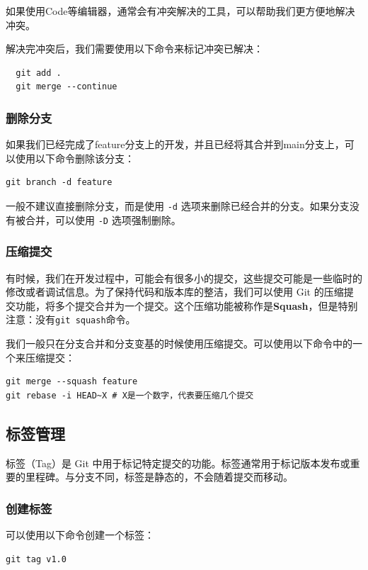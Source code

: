 \documentclass[../main.tex]{subfiles}
\begin{document}
如果使用Code等编辑器，通常会有冲突解决的工具，可以帮助我们更方便地解决冲突。

解决完冲突后，我们需要使用以下命令来标记冲突已解决：
\begin{verbatim}
  git add .
  git merge --continue
\end{verbatim}

\subsubsection{删除分支}

如果我们已经完成了feature分支上的开发，并且已经将其合并到main分支上，可以使用以下命令删除该分支：
\begin{verbatim}
git branch -d feature
\end{verbatim}

一般不建议直接删除分支，而是使用 \texttt{-d} 选项来删除已经合并的分支。如果分支没有被合并，可以使用 \texttt{-D} 选项强制删除。

\subsubsection{压缩提交}

有时候，我们在开发过程中，可能会有很多小的提交，这些提交可能是一些临时的修改或者调试信息。为了保持代码和版本库的整洁，我们可以使用 Git 的压缩提交功能，将多个提交合并为一个提交。这个压缩功能被称作是\textbf{Squash}，但是特别注意：没有\texttt{git squash}命令。

我们一般只在分支合并和分支变基的时候使用压缩提交。可以使用以下命令中的一个来压缩提交：
\begin{verbatim}
git merge --squash feature
git rebase -i HEAD~X # X是一个数字，代表要压缩几个提交
\end{verbatim}

\subsection{标签管理}
标签（Tag）是 Git 中用于标记特定提交的功能。标签通常用于标记版本发布或重要的里程碑。与分支不同，标签是静态的，不会随着提交而移动。

\subsubsection{创建标签}
可以使用以下命令创建一个标签：
\begin{verbatim}
git tag v1.0
\end{verbatim}
\end{document}
